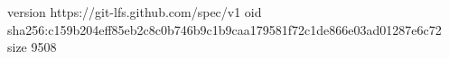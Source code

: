 version https://git-lfs.github.com/spec/v1
oid sha256:c159b204eff85eb2c8c0b746b9c1b9caa179581f72c1de866e03ad01287e6c72
size 9508
